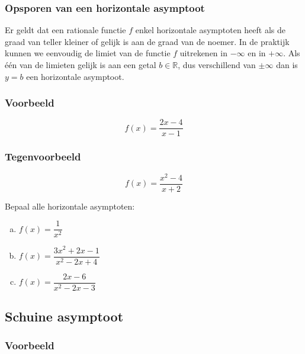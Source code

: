 \documentclass[12pt,twoside,a4paper]{article}
\begin{document}
\subsubsection*{Opsporen van een horizontale asymptoot}

Er geldt dat een rationale functie $f$ enkel horizontale asymptoten heeft als de graad van teller kleiner of gelijk is aan de graad van de noemer. In de praktijk kunnen we eenvoudig de limiet van de functie $f$ uitrekenen in $-\infty$ en in $+\infty$. Als één van de limieten gelijk is aan een getal $b\in\mathbb{R}$, dus verschillend van $\pm\infty$ dan is $y=b$ een horizontale asymptoot.

\subsubsection*{Voorbeeld}
$$f(x)=\dfrac{2x-4}{x-1}$$

\subsubsection*{Tegenvoorbeeld}
$$f(x)=\dfrac{x^2-4}{x+2}$$

\begin{oefening}
Bepaal alle horizontale asymptoten:
\begin{enumerate}[(a)]
  \itemsep.5em
  \item $f(x)=\dfrac{1}{x^2}$
  \item $f(x)=\dfrac{3x^2+2x-1}{x^2-2x+4}$
  \item $f(x)=\dfrac{2x-6}{x^2-2x-3}$
\end{enumerate}
\end{oefening}

\subsection{Schuine asymptoot}

\subsubsection*{Voorbeeld}
\end{document}
